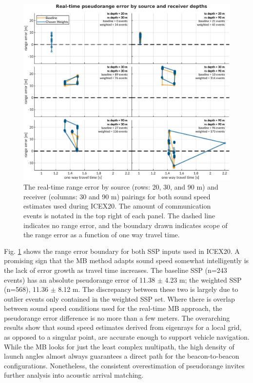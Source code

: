 \begin{figure}[h!]
  \centering
  \includegraphics[width=\columnwidth]{figs/range-error-insitu.pdf}
  \caption{The real-time range error by source (rows: 20, 30, and 90 m) and receiver (columns: 30 and 90 m) pairings for both sound speed estimates used during ICEX20. The amount of communication events is notated in the top right of each panel. The dashed line indicates no range error, and the boundary drawn indicates scope of the range error as a function of one way travel time.}
  \label{fig:range-error-insitu}
\end{figure}

Fig. \ref{fig:range-error-insitu} shows the range error boundary for both SSP inputs used in ICEX20.
A promising sign that the MB method adapts sound speed somewhat intelligently is the lack of error growth as travel time increases.
The baseline SSP (n=243 events) has an absolute pseudorange error of 11.38 $\pm$ 4.23 m; the weighted SSP (n=568), 11.36 $\pm$ 8.12 m.
The discrepancy between these two is largely due to outlier events only contained in the weighted SSP set.
Where there is overlap between sound speed conditions used for the real-time MB approach, the pseudorange error difference is no more than a few meters.
The overarching results show that sound speed estimates derived from eigenrays for a local grid, as opposed to a singular point, are accurate enough to support vehicle navigation.
While the MB looks for just the least complex multipath, the high density of launch angles almost always guarantees a direct path for the beacon-to-beacon configurations.
Nonetheless, the consistent overestimation of pseudorange invites further analysis into acoustic arrival matching.

